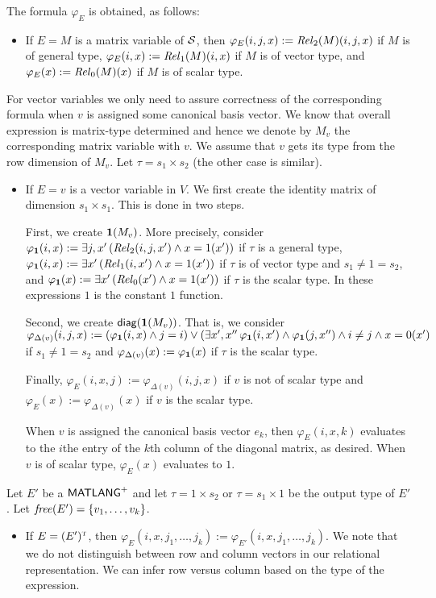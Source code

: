 The formula $\varphi_E$ is obtained, as follows:
\begin{itemize}
\item If $E = M$ is a matrix variable of $\mathcal{S}$, then $\varphi_E(i,j,x):=\mathit{Rel}_2(M)(i,j,x)$ if $M$ is of general type,
 $\varphi_E(i,x):=\mathit{Rel}_1(M)(i,x)$ if $M$ is of vector type, and $\varphi_E(x):=\mathit{Rel}_0(M)(x)$ if $M$ is of scalar type.
 \end{itemize}
 
 For  vector variables we only need to assure correctness of the corresponding formula when $v$ is assigned
some canonical basis vector.  We know that overall expression is matrix-type determined and hence we denote by $M_v$ the corresponding
matrix variable with $v$. We assume that $v$ gets its type from the row dimension of $M_v$. Let $\tau=s_1\times s_2$ (the other case is similar).
 \begin{itemize}
\item If $E = v$ is a vector variable in $V$. We first create the identity matrix of dimension $s_1\times s_1$. This is done in two steps.

First, we create $\mathbf{1}(M_v)$. More precisely, consider $\varphi_{\mathbf{1}}(i,x):=\exists j, x'\, (\mathit{Rel}_2(i,j,x')\land x=1(x'))$ if $\tau$ is a general type,
$\varphi_{\mathbf{1}}(i,x):=\exists  x'\, (\mathit{Rel}_1(i,x')\land x=1(x'))$  if $\tau$ is of vector type and $s_1\neq 1=s_2$, 
and $\varphi_{\mathbf{1}}(x):=\exists x'\, (\mathit{Rel}_0(x')\land x=1(x'))$  if $\tau$ is the scalar type. In these expressions $1$  is the constant $1$ function.

Second, we create $\mathsf{diag}(\mathbf{1}(M_v))$. That is, we consider $\varphi_{\Delta(v)}(i,j,x):=(\varphi_{\mathbf{1}}(i,x)\land j=i)\vee (\exists x',x''\, \varphi_{\mathbf{1}}(i,x')\land\varphi_{\mathbf{1}}(j,x'')\land i\neq j \land x=0(x')$ if $s_1 \neq 1 = s_2$ and  $\varphi_{\Delta(v)}(x):=\varphi_{\mathbf{1}}(x)$ if $\tau$ is the scalar type.

Finally, $\varphi_E(i,x,j):=\varphi_{\Delta(v)}(i,j,x)$ if $v$ is not of scalar type and
$\varphi_E(x):=\varphi_{\Delta(v)}(x)$ if $v$ is the scalar type.

When $v$ is assigned the canonical basis vector $e_k$, then  $\varphi_E(i,x,k)$ evaluates to the $i$the entry of the $k$th column of the diagonal matrix, as desired. When $v$ is of scalar type, $\varphi_E(x)$ evaluates to $1$.
 \end{itemize}
 Let $E'$ be a $\mathsf{MATLANG}^{\sf +}$ and let $\tau = 1 \times s_2$ or $\tau=s_1\times 1$ be the output type of $E'$. Let $\operatorname{\mathit{free}}(E')=\{v_1,\ldots,v_k\}$.
 \begin{itemize}
\item If $E= (E')^{\textsc{t}}$, then $\varphi_E(i,x,j_1,\ldots,j_k):=\varphi_{E'}(i,x,j_1,\ldots,j_k)$. We note that we do not distinguish between row and column vectors in our relational representation. We can infer row versus column based on the type of the expression. 
\end{itemize}

